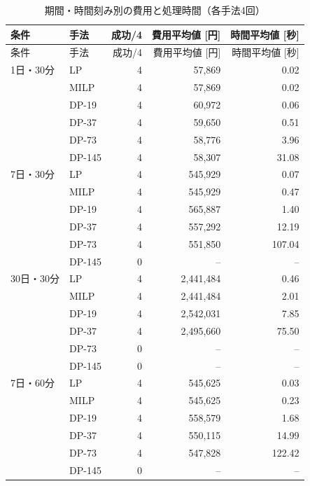 \documentclass[a4paper,11pt,xelatex,ja=standard]{bxjsarticle}
\begin{document}
\begingroup
\small
\setlength{\tabcolsep}{3pt}
\begin{longtable}{llrrr}
    \caption{期間・時間刻み別の費用と処理時間（各手法4回）}\label{tab:period} \\
    \toprule
    条件      & 手法     & 成功/4 & 費用平均値 [円] & 時間平均値 [秒]     \\
    \midrule
    \endfirsthead
    \toprule
    条件      & 手法     & 成功/4 & 費用平均値 [円] & 時間平均値 [秒]     \\
    \midrule
    \endhead
    1日・30分  & LP     & 4    & 57,869    & 0.02          \\
            & MILP   & 4    & 57,869    & 0.02          \\
            & DP-19  & 4    & 60,972    & 0.06          \\
            & DP-37  & 4    & 59,650    & 0.51          \\
            & DP-73  & 4    & 58,776    & 3.96          \\
            & DP-145 & 4    & 58,307    & 31.08         \\
    \midrule
    7日・30分  & LP     & 4    & 545,929   & 0.07          \\
            & MILP   & 4    & 545,929   & 0.47          \\
            & DP-19  & 4    & 565,887   & 1.40          \\
            & DP-37  & 4    & 557,292   & 12.19         \\
            & DP-73  & 4    & 551,850   & 107.04        \\
            & DP-145 & 0    & --        & --            \\
    \midrule
    30日・30分 & LP     & 4    & 2,441,484 & 0.46          \\
            & MILP   & 4    & 2,441,484 & 2.01          \\
            & DP-19  & 4    & 2,542,031 & 7.85          \\
            & DP-37  & 4    & 2,495,660 & 75.50         \\
            & DP-73  & 0    & --        & --            \\
            & DP-145 & 0    & --        & --            \\
    \midrule
    7日・60分  & LP     & 4    & 545,625   & 0.03          \\
            & MILP   & 4    & 545,625   & 0.23          \\
            & DP-19  & 4    & 558,579   & 1.68          \\
            & DP-37  & 4    & 550,115   & 14.99         \\
            & DP-73  & 4    & 547,828   & 122.42        \\
            & DP-145 & 0    & --        & --            \\
    \bottomrule
\end{longtable}
\endgroup
\end{document}
